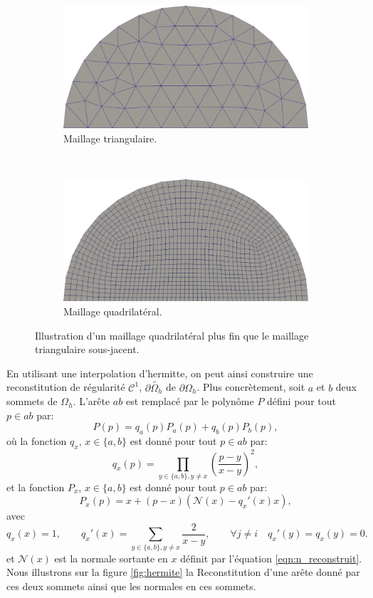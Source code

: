 \begin{figure}[h!]
\centering
\begin{subfigure}{0.65\textwidth}
    \includegraphics[width=\textwidth]{images/non_hermite_mesh_tri.pdf}
    \caption{Maillage triangulaire.}
    \label{fig:mail_tri_vs_mail_quad_1}
\end{subfigure}
\\[0.5cm]
\begin{subfigure}{0.65\textwidth}
    \includegraphics[width=\textwidth]{images/non_hermite_quad.pdf}
    \caption{Maillage quadrilatéral.}
    \label{fig:mail_tri_vs_mail_quad_2}
\end{subfigure}
\caption{Illustration d'un maillage quadrilatéral plus fin que le maillage triangulaire sous-jacent.}
\label{fig:mail_tri_vs_mail_quad}
\end{figure}
En utilisant une interpolation d'hermitte, on peut ainsi construire une reconstitution de régularité $\mathcal{C}^1$, $\partial\widetilde{\Omega_h}$ de $\partial\Omega_h$. Plus concrètement, soit $a$ et $b$ deux sommets de $\Omega_h$. L'arête $ab$ est remplacé par le polynôme $P$ défini pour tout $p\in ab$ par:
\[P(p) = q_a(p)P_a(p)+q_b(p)P_b(p),\]
où la fonction $q_x$, $x\in\{a, b\}$ est donné pour tout $p\in ab$ par:
\[q_x(p) = \prod_{y\in\{a,b\}, y\neq x} \left(\frac{p - y}{x - y}\right)^2,\]
et la fonction $P_x$, $x\in\{a, b\}$ est donné pour tout $p\in ab$ par:
\[P_x(p) = x + (p - x) \left(\mathcal{N}(x) - q_x'(x)x\right),\]
avec
\[q_x(x)=1,\quad\quad
q_x'(x)=\sum_{y\in\{a,b\}, y\neq x}\frac{2}{x - y},\quad\quad
\forall j \neq i \quad q_x'(y) = q_x(y) = 0.
\]
et $\mathcal{N}(x)$ est la normale sortante en $x$ définit par l'équation \eqref{eqn:n_reconstruit}. Nous illustrons sur la figure \ref{fig:hermite} la Reconstitution d'une arête donné par ces deux sommets ainsi que les normales en ces sommets.



